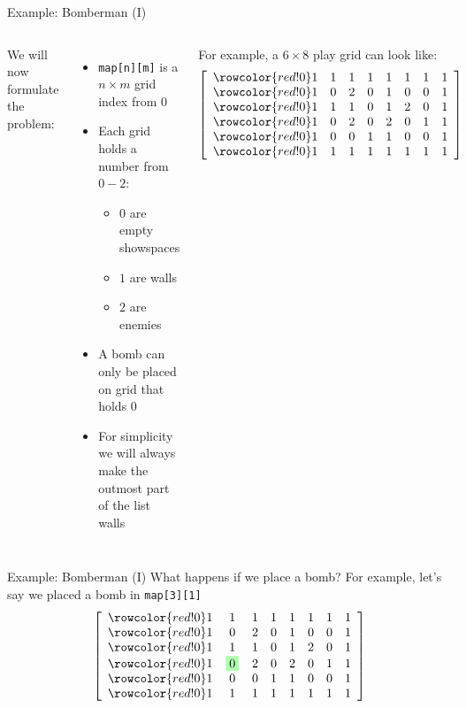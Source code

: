 \documentclass[10pt,xcolor={table,dvipsnames},t]{beamer}
\begin{document}
\begin{frame}{Example: Bomberman (I)}
  
  \begin{columns}
    We will now formulate the problem:
    \begin{itemize}
      \item \texttt{map[n][m]} is a $n\times m$ grid index from 0
      \item Each grid holds a number from $0-2$:
      \begin{itemize}
        \item $0$ are empty showspaces 
        \item $1$ are walls 
        \item $2$ are enemies
      \end{itemize}
      \item A bomb can only be placed on grid that holds $0$
      \item For simplicity we will always make the outmost part of the list walls
    \end{itemize}
    For example, a $6\times 8$ play grid can look like:
    \begin{align*}
      \left[
      \begin{array}{cccccccc}
        \rowcolor{red!0}
        1 & 1 & 1 & 1 & 1 & 1 & 1 & 1 \\
        \rowcolor{red!0}
        1 & 0 & 2 & 0 & 1 & 0 & 0 & 1 \\
        \rowcolor{red!0}
        1 & 1 & 1 & 0 & 1 & 2 & 0& 1 \\
        \rowcolor{red!0}
        1 & 0 & 2 & 0 & 2 & 0 & 1 & 1 \\
        \rowcolor{red!0}
        1 & 0 & 0 & 1 & 1 & 0 & 0 & 1 \\
        \rowcolor{red!0}
        1 & 1 & 1 & 1 & 1 & 1 & 1 & 1 
      \end{array}
      \right]
    \end{align*}
  \end{columns}
\end{frame}

\begin{frame}{Example: Bomberman (I)}
  What happens if we place a bomb? For example, let's say we placed a bomb in \texttt{map[3][1]}
  \begin{align*}
    \left[
    \begin{array}{cccccccc}
      \rowcolor{red!0}
      1 & 1 & 1 & 1 & 1 & 1 & 1 & 1 \\
      \rowcolor{red!0}
      1 & 0 & 2 & 0 & 1 & 0 & 0 & 1 \\
      \rowcolor{red!0}
      1 & 1 & 1 & 0 & 1 & 2 & 0& 1 \\
      \rowcolor{red!0}
      1 & \fcolorbox{black!0}{green!30}{$0$} & 2 & 0 & 2 & 0 & 1 & 1 \\
      \rowcolor{red!0}
      1 & 0 & 0 & 1 & 1 & 0 & 0 & 1 \\
      \rowcolor{red!0}
      1 & 1 & 1 & 1 & 1 & 1 & 1 & 1 
    \end{array}
    \right]
  \end{align*}
\end{frame}
\end{document}
